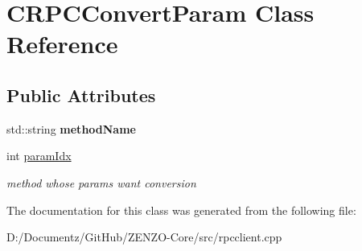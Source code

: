 \hypertarget{class_c_r_p_c_convert_param}{}\section{C\+R\+P\+C\+Convert\+Param Class Reference}
\label{class_c_r_p_c_convert_param}
\subsection*{Public Attributes}
\begin{DoxyCompactItemize}
\item 
\mbox{\label{class_c_r_p_c_convert_param_a072d6cde94ea57223445dee927ee1527}} 
std\+::string {\bfseries method\+Name}
\item 
\mbox{\label{class_c_r_p_c_convert_param_a3bd464f8d5db060616e7be8fbacb58f8}} 
int \mbox{\hyperlink{class_c_r_p_c_convert_param_a3bd464f8d5db060616e7be8fbacb58f8}{param\+Idx}}
\begin{DoxyCompactList}\small\item\em method whose params want conversion \end{DoxyCompactList}\end{DoxyCompactItemize}


The documentation for this class was generated from the following file\+:\begin{DoxyCompactItemize}
\item 
D\+:/\+Documentz/\+Git\+Hub/\+Z\+E\+N\+Z\+O-\/\+Core/src/rpcclient.\+cpp\end{DoxyCompactItemize}

